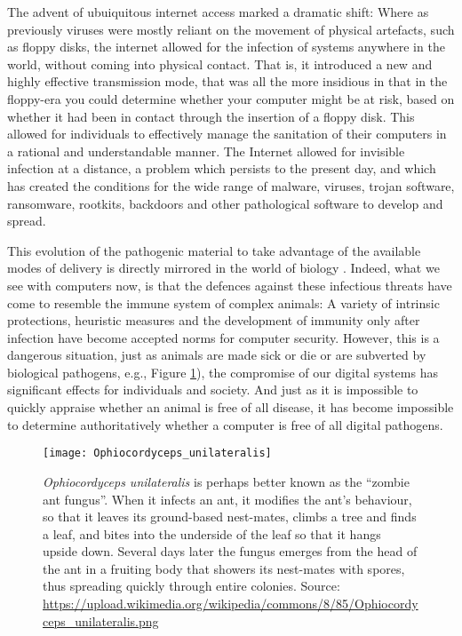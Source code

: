 The advent of ubuiquitous internet access marked a dramatic shift:  Where as previously viruses were mostly reliant on the
movement of physical artefacts, such as floppy disks, the internet allowed for the infection of systems anywhere in the
world, without coming into physical contact.
That is, it introduced a new and highly effective transmission mode, that was all the more insidious in that in the floppy-era
you could determine whether your computer might be at risk, based on whether it had been in contact through the insertion of
a floppy disk.
This allowed for individuals to effectively manage the sanitation of their computers in a rational and understandable manner.
The Internet allowed for invisible infection at a distance, a problem which persists to the present day, and which has created
the conditions for the wide range of malware, viruses, trojan software, ransomware, rootkits, backdoors and other pathological
software to develop and spread.

This evolution of the pathogenic material to take advantage of the available modes of delivery is directly mirrored in the
world of biology \cite{antonovics2017evolution}.
Indeed, what we see with computers now, is that the defences against these infectious threats have come to resemble the
immune system of complex animals: A variety of intrinsic protections, heuristic measures and the development of immunity only
after infection have become accepted norms for computer security.
However, this is a dangerous situation, just as animals are made sick or die or are subverted by biological pathogens, e.g., Figure \ref{fig:antzombies}), the
compromise of our digital systems has significant effects for individuals and society.  And just as it is impossible to quickly
appraise whether an animal is free of all disease, it has become impossible to determine authoritatively whether a computer
is free of all digital pathogens.

\begin{figure}
  \label{fig:antzombies}
  \centering
  \texttt{[image: Ophiocordyceps\_unilateralis]}
  \caption{
    {\em Ophiocordyceps unilateralis} is perhaps better known as the ``zombie ant fungus''.  When it infects an ant,
    it modifies the ant's behaviour, so that it leaves its ground-based nest-mates, climbs a tree and finds a leaf,
    and bites into the underside of the leaf so that it hangs upside down. Several days later the fungus emerges from
    the head of the ant in a fruiting body that showers its nest-mates with spores, thus spreading quickly through
    entire colonies.  Source: 
    \url{https://upload.wikimedia.org/wikipedia/commons/8/85/Ophiocordyceps_unilateralis.png}
  }
    
\end{figure}

